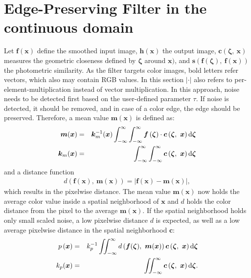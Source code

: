 \section{Edge-Preserving Filter in the continuous domain}
\label{sec:appendix_formulationoftheedgepreservingfilterinthecontinuousdomain}

Let $\bm{f}(\bm{x})$ define the smoothed input image, $\bm{h}(\bm{x})$ the output image, $\bm{c}( \bm{\zeta},\ \bm{x})$ measures the geometric closeness defined by $\bm{\zeta}$ around $\bm{x})$, and $\bm{s}(\bm{f} ( \bm{\zeta}),\ \bm{f} ( \bm{x} ))$ the photometric similarity.
As the filter targets color images, bold letters refer vectors, which also may contain RGB values.
In this section $|\cdot|$ also refers to per-element-multiplication instead of vector multiplication. 
In this approach, noise needs to be detected first based on the user-defined parameter $\tau$.
If noise is detected, it should be removed, and in case of a color edge, the edge should be preserved.
Therefore, a mean value $\bm{m} (\bm{x})$ is defined as:
\begin{eqnarray}
  \bm{m} (\bm{x}) &=& \bm{k}^{-1}_m(\bm{x}) \int_{-\infty}^{\infty} \int_{-\infty}^{\infty} \bm{f} \left( \bm{\zeta} \right) \cdot \bm{c} \left( \bm{\zeta},\ \bm{x} \right) {\textrm d} \bm{\zeta} \nonumber \\
  \bm{k}_m (\bm{x}) &=& \int_{-\infty}^{\infty} \int_{-\infty}^{\infty} \bm{c} \left( \bm{\zeta},\ \bm{x} \right) {\textrm d} \bm{\zeta}
\end{eqnarray}
and a distance function 
\begin{eqnarray}
  d \left( \bm{f} \left( \bm{x} \right),\ \bm{m} \left( \bm{x} \right) \right) = \left| \bm{f} \left( \bm{x} \right) - \bm{m} \left( \bm{x} \right) \right|,
\end{eqnarray}
which results in the pixelwise distance. 
The mean value $\bm{m} (\bm{x})$ now holds the average color value inside a spatial neighborhood of $\bm{x}$ and $d$ holds the color distance from the pixel to the average $\bm{m} (\bm{x})$. 
If the spatial neighborhood holds only small scaled noise, a low pixelwise distance $d$ is expected, as well as a low average pixelwise distance in the spatial neighborhood $\bm{c}$:
\begin{eqnarray}
  p \left( \bm{x} \right) &=& k^{-1}_p \iint_{-\infty}^{\infty} d \left( \bm{f}(\bm{\zeta}),\ \bm{m}(\bm{x}) \right) \bm{c} \left( \bm{\zeta},\ \bm{x} \right) {\textrm d} \bm{\zeta} \nonumber \\
  k_p (\bm{x}) &=& \iint_{-\infty}^{\infty} \bm{c} \left( \bm{\zeta},\ \bm{x} \right) {\textrm d} \bm{\zeta} .
\end{eqnarray}

